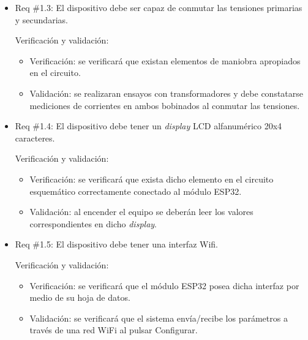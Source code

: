\documentclass[11pt]{charter}
\begin{document}
\begin{itemize} 
\item Req \#1.3: El dispositivo debe ser capaz de conmutar las tensiones primarias y secundarias.

Verificación y validación:

\begin{itemize}
\item Verificación: se verificará que existan elementos de maniobra apropiados en el circuito.
\item Validación: se realizaran ensayos con transformadores y debe constatarse mediciones de corrientes en ambos bobinados al conmutar las tensiones.  
\end{itemize}

\end{itemize}

\begin{itemize} 
\item Req \#1.4: El dispositivo debe tener un \textit{display} LCD alfanumérico 20x4 caracteres.

Verificación y validación:

\begin{itemize}
\item Verificación: se verificará que exista dicho elemento en el circuito esquemático correctamente conectado al módulo ESP32.
\item Validación: al encender el equipo se deberán leer los valores correspondientes en dicho \textit{display}.  
\end{itemize}

\end{itemize}

\begin{itemize} 
\item Req \#1.5: El dispositivo debe tener una interfaz Wifi.

Verificación y validación:

\begin{itemize}
\item Verificación: se verificará que el módulo ESP32 posea dicha interfaz por medio de su hoja de datos. 
\item Validación: se verificará que el sistema envía/recibe los parámetros a través de una red WiFi al pulsar Configurar. 
\end{itemize}

\end{itemize}
\end{document}
